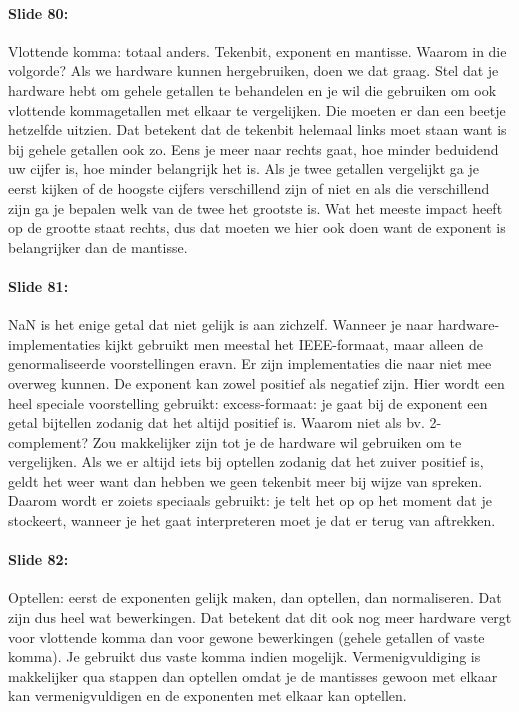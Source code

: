 \documentclass[10pt,a4paper]{book}
\begin{document}
\paragraph{Slide 80:} Vlottende komma: totaal anders. Tekenbit, exponent en mantisse. Waarom in die volgorde? Als we hardware kunnen hergebruiken, doen we dat graag. Stel dat je hardware hebt om gehele getallen te behandelen en je wil die gebruiken om ook vlottende kommagetallen met elkaar te vergelijken. Die moeten er dan een beetje hetzelfde uitzien. Dat betekent dat de tekenbit helemaal links moet staan want is bij gehele getallen ook zo. Eens je meer naar rechts gaat, hoe minder beduidend uw cijfer is, hoe minder belangrijk het is. Als je twee getallen vergelijkt ga je eerst kijken of de hoogste cijfers verschillend zijn of niet en als die verschillend zijn ga je bepalen welk van de twee het grootste is. Wat het meeste impact heeft op de grootte staat rechts, dus dat moeten we hier ook doen want de exponent is belangrijker dan de mantisse.

\paragraph{Slide 81:} NaN is het enige getal dat niet gelijk is aan zichzelf. Wanneer je naar hardware-implementaties kijkt gebruikt men meestal het IEEE-formaat, maar alleen de genormaliseerde voorstellingen eravn. Er zijn implementaties die naar niet mee overweg kunnen. De exponent kan zowel positief als negatief zijn. Hier wordt een heel speciale voorstelling gebruikt: excess-formaat: je gaat bij de exponent een getal bijtellen zodanig dat het altijd positief is. Waarom niet als bv. 2-complement? Zou makkelijker zijn tot je de hardware wil gebruiken om te vergelijken. Als we er altijd iets bij optellen zodanig dat het zuiver positief is, geldt het weer want dan hebben we geen tekenbit meer bij wijze van spreken. Daarom wordt er zoiets speciaals gebruikt: je telt het op op het moment dat je stockeert, wanneer je het gaat interpreteren moet je dat er terug van aftrekken.

\paragraph{Slide 82:} Optellen: eerst de exponenten gelijk maken, dan optellen, dan normaliseren. Dat zijn dus heel wat bewerkingen. Dat betekent dat dit ook nog meer hardware vergt voor vlottende komma dan voor gewone bewerkingen (gehele getallen of vaste komma). Je gebruikt dus vaste komma indien mogelijk. Vermenigvuldiging is makkelijker qua stappen dan optellen omdat je de mantisses gewoon met elkaar kan vermenigvuldigen en de exponenten met elkaar kan optellen. 
\end{document}
